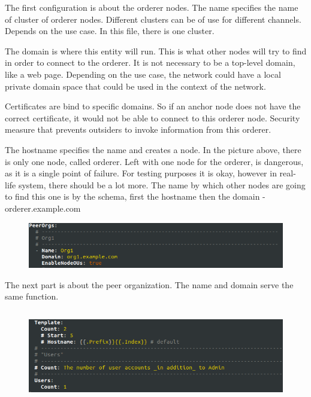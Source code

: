 \documentclass[a4paper,11pt]{report}
\begin{document}
The first configuration is about the orderer nodes. The name specifies the name of cluster of orderer nodes. Different clusters can be of use for different channels. Depends on the use case. In this file, there is one cluster.

The domain is where this entity will run. This is what other nodes will try to find in order to connect to the orderer. It is not necessary to be a top-level domain, like a web page. Depending on the use case, the network could have a local private domain space that could be used in the context of the network.

Certificates are bind to specific domains. So if an anchor node does not have the correct certificate, it would not be able to connect to this orderer node. Security measure that prevents outsiders to invoke information from this orderer.

The hostname specifies the name and creates a node. In the picture above, there is only one node, called orderer. Left with one node for the orderer, is dangerous, as it is a single point of failure. For testing purposes it is okay, however in real-life system, there should be a lot more. The name by which other nodes are going to find this one is by the schema, first the hostname then the domain - orderer.example.com

\begin{figure}[h]
\centering
  \includegraphics[width = 16cm]{cryptoconfig2.png}
  \caption{ }
  \label{cryptoconfig2}
\end{figure}

The next part is about the peer organization. The name and domain serve the same function. 

\begin{figure}[h]
\centering
  \includegraphics[height = 4cm,width = 16cm]{cryptoconfig3.png}
  \caption{ }
  \label{cryptoconfig3}
\end{figure}
\end{document}
